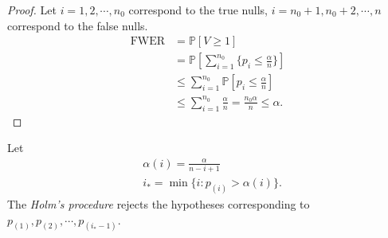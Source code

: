 \documentclass[a4paper]{article}
\begin{document}
\begin{proof}
	Let $i=1,2,\cdots,n_0$ correspond to the true nulls, $i = n_0+1,n_0+2, \cdots, n$ correspond to the false nulls.
	\begin{equation}
		\begin{aligned}
			\text{FWER} &= \mathbb{P}[V \geq 1] \\
			&= \mathbb{P}\left[\sum\limits_{i=1}^{n_0} \{p_i \leq \frac{\alpha}{n}\}\right] \\
			&\leq \sum\limits_{i=1}^{n_0} \mathbb{P}\left[p_i \leq \frac{\alpha}{n}\right] \\
			&\leq \sum\limits_{i=1}^{n_0} \frac{\alpha}{n} = \frac{n_0 \alpha}{n} \leq \alpha.
		\end{aligned}
	\end{equation}
\end{proof}

\begin{defi}
	Let
	\begin{equation}
		\begin{aligned}
			& \alpha(i) = \frac{\alpha}{n-i+1} \\
			& i_{*} = \min\{i:p_{(i)} > \alpha(i)\}.
		\end{aligned}
	\end{equation}
	The \emph{Holm's procedure} rejects the hypotheses corresponding to $p_{(1)},p_{(2)},\cdots,p_{(i_{*}-1)}$.
\end{defi}
\end{document}
